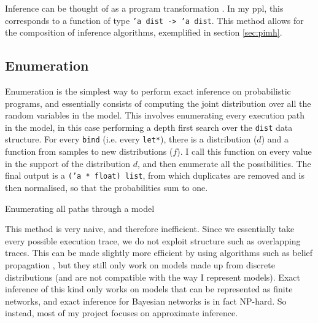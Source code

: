 Inference can be thought of as a program transformation \cite{scibior2015practical} \cite{Zinkov2016ComposingIA}. In my ppl, this corresponds to a function of type \texttt{'a dist -> 'a dist}. This method allows for the composition of inference algorithms, exemplified in section \ref{sec:pimh}.
	
		
		
		
		
\subsection{Enumeration} \label{sec:enum}
Enumeration is the simplest way to perform exact inference on probabilistic programs, and essentially consists of computing the joint distribution over all the random variables in the model. This involves enumerating every execution path in the model, in this case performing a depth first search over the \texttt{dist} data structure. For every \texttt{bind} (i.e. every \texttt{let*}), there is a distribution ($d$) and a function from samples to new distributions ($f$). I call this function on every value in the support of the distribution $d$, and then enumerate all the possibilities. The final output is a \texttt{('a * float) list}, from which duplicates are removed and is then normalised, so that the probabilities sum to one.
		
\begin{listing}[ht]
	\caption{Enumerating all paths through a model}
	\label{lst:enum}
\end{listing}
		
This method is very naive, and therefore inefficient. Since we essentially take every possible execution trace, we do not exploit structure such as overlapping traces. This can be made slightly more efficient by using algorithms such as belief propagation \cite{belief-prop}, but they still only work on models made up from discrete distributions (and are not compatible with the way I represent models). Exact inference of this kind only works on models that can be represented as finite networks, and exact inference for Bayesian networks is in fact NP-hard\cite{cooper1990computational}. So instead, most of my project focuses on approximate inference.
		
